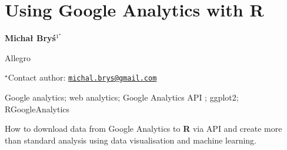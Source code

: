 \documentclass[\main/boa.tex]{subfiles}
\begin{document}
\section{Using Google Analytics with R}

\begin{center}
  {\bf {} Michał Bryś$^{1^\star}$}
\end{center}

\vskip 0.3cm

\begin{affiliations}
\begin{enumerate}
\begin{minipage}{0.915\textwidth}
\centering
\item Allegro \\[-2pt]
\end{minipage}
\end{enumerate}
$^\star$Contact author: \href{mailto:michal.brys@gmail.com}{\nolinkurl{michal.brys@gmail.com}}\\
\end{affiliations}

\vskip 0.5cm

\begin{minipage}{0.915\textwidth}
\keywords Google analytics; web analytics; Google Analytics API
\packages {};  ggplot2;  RGoogleAnalytics
\end{minipage}

\vskip 0.8cm

How to download data from Google Analytics to \textbf{R} via API and
create more than standard analysis using data visualisation and machine
learning.
\end{document}
